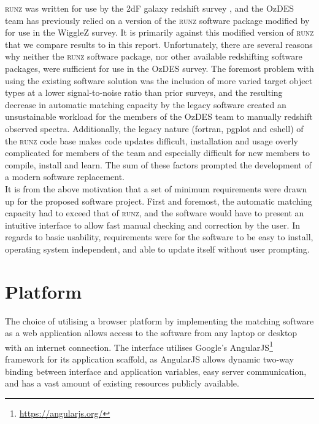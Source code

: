 \documentclass[iop]{emulateapj}
\newcommand{\runz}{\textsc{runz}}
\begin{document}
\runz{} was written for use by the 2dF galaxy redshift survey \citep{colless2001}, and the OzDES team has previously relied on a version of the \runz{} software package modified by \citet{saunders2004} for use in the WiggleZ survey. It is primarily against this modified version of \runz{} that we compare results to in this report.  Unfortunately, there are several reasons why neither the \runz{} software package, nor other available redshifting software packages, were sufficient for use in the OzDES survey. The foremost problem with using the existing software solution was the inclusion of more varied target object types at a lower signal-to-noise ratio than prior surveys, and the resulting decrease in automatic matching capacity by the legacy software created an unsustainable workload for the members of the OzDES team to manually redshift observed spectra. Additionally, the legacy nature (fortran, pgplot and cshell) of the \runz{} code base makes code updates difficult, installation and usage overly complicated for members of the team and especially difficult for new members to compile, install and learn. The sum of these factors prompted the development of a modern software replacement.\\

It is from the above motivation that a set of minimum requirements were drawn up for the proposed software project. First and foremost, the automatic matching capacity had to exceed that of \runz{}, and the software would have to present an intuitive interface to allow fast manual checking and correction by the user. In regards to basic usability, requirements were for the software to be easy to install, operating system independent, and able to update itself without user prompting. 



\section{Platform}

The choice of utilising a browser platform by implementing the matching software as a web application allows access to the software from any laptop or desktop with an internet connection. The interface utilises Google's AngularJS\footnote{\url{https://angularjs.org/}} framework for its application scaffold, as AngularJS allows dynamic two-way binding between interface and application variables, easy server communication, and has a vast amount of existing resources publicly available.\\
\end{document}
